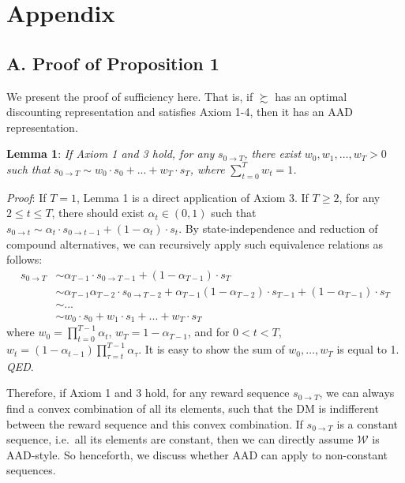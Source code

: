 \newpage

\hypertarget{appendix}{%
\section*{Appendix}\label{appendix}}

\hypertarget{a.-proof-of-proposition-1}{%
\subsection*{A. Proof of Proposition
1}\label{a.-proof-of-proposition-1}}

We present the proof of sufficiency here. That is, if \(\succsim\) has
an optimal discounting representation and satisfies Axiom 1-4, then it
has an AAD representation.

\noindent \textbf{Lemma 1}: \emph{If Axiom 1 and 3 hold, for any}
\(s_{0\rightarrow T}\)\emph{, there exist} \(w_0, w_1, …, w_T > 0\)
\emph{such that}
\(s_{0\rightarrow T} \sim w_0 \cdot s_0 + ...+w_T\cdot s_T\)\emph{,
where} \(\sum_{t=0}^T w_t=1\)\emph{.}

\noindent \emph{Proof}: If \(T=1\), Lemma 1 is a direct application of
Axiom 3. If \(T\geq 2\), for any \(2\leq t\leq T\), there should exist
\(\alpha_t\in(0,1)\) such that
\(s_{0\rightarrow t}\sim \alpha_t\cdot s_{0\rightarrow t-1}+(1-\alpha_t)\cdot s_{t}\).
By state-independence and reduction of compound alternatives, we can
recursively apply such equivalence relations as follows:\[
\begin{aligned}
s_{0\rightarrow T} &\sim \alpha_{T-1}\cdot s_{0\rightarrow T-1} + (1-\alpha_{T-1})\cdot s_T \\
&\sim  \alpha_{T-1}\alpha_{T-2}\cdot s_{0\rightarrow T-2} + \alpha_{T-1}(1-\alpha_{T-2})\cdot s_{T-1} + (1-\alpha_{T-1})\cdot s_T \\
& \sim ...\\
& \sim w_0 \cdot s_0 + w_1\cdot s_1 +... +w_T\cdot s_T
\end{aligned}
\]where \(w_0=\prod_{t=0}^{T-1}\alpha_t\), \(w_T = 1-\alpha_{T-1}\), and
for \(0<t<T\),
\(w_t=(1-\alpha_{t-1})\prod_{\tau=t}^{T-1}\alpha_{\tau}\). It is easy to
show the sum of \(w_0,…,w_T\) is equal to 1. \emph{QED}.

Therefore, if Axiom 1 and 3 hold, for any reward sequence
\(s_{0\rightarrow T}\), we can always find a convex combination of all
its elements, such that the DM is indifferent between the reward
sequence and this convex combination. If \(s_{0\rightarrow T}\) is a
constant sequence, i.e.~all its elements are constant, then we can
directly assume \(\mathcal{W}\) is AAD-style. So henceforth, we discuss
whether AAD can apply to non-constant sequences.


